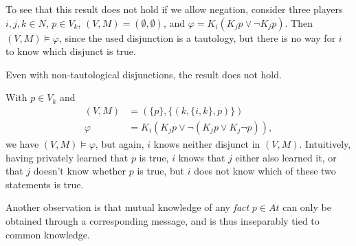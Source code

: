 \documentclass{article}
\newcounter{#1}
\newcommand{\state}[1][]{\ensuremath{(V#1,M#1)}\xspace}
\newcommand{\msg}[3]{\ensuremath{(#1,#2,#3)}\xspace}
\newcommand{\bits}{\ensuremath{At}\xspace}
\newcommand{\knows}[1]{\ensuremath{K_{#1}}\xspace}
\renewcommand{\enspace}{}
\begin{document}
To see that this result does not hold if we allow negation,
consider three players $i,j,k\in N$, $p\in V_k$,
$\state=(\emptyset,\emptyset)$, and
$\varphi=\knows i( \knows j p\vee\neg \knows j p)$.
Then $\state\vDash\varphi$, since the used disjunction is a tautology,
but there is no way for $i$ to know which disjunct is true.

Even with non-tautological disjunctions, the result does not hold.
\begin{example}
  \label{ex:k-disjunction-doesnt-distribute-with-negation}
  With $p\in V_k$ and
  \begin{align*}
    \state&=(\{p\},\{\msg{k}{\{i,k\}}{p}\})\\
    \varphi&=\knows i(\knows j p\vee\neg(\knows j p\vee \knows j\neg p))\enspace,
  \end{align*}
  we have $\state\vDash\varphi$, but again, $i$ knows neither disjunct in $\state$.
  Intuitively, having privately learned that $p$ is true,
  $i$ knows that $j$ either also learned it,
  or that $j$ doesn't know whether $p$ is true,
  but $i$ does not know which of these two statements is true.
\end{example}

Another observation is that
mutual knowledge of any \emph{fact} $p\in\bits$ can only be obtained through a corresponding message, and is thus inseparably tied to common knowledge.
\end{document}

